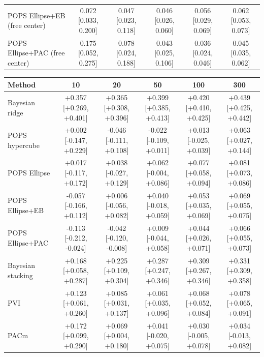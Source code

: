 \begin{tabular}{lccccc}
POPS Ellipse+EB (free center) & 0.072 {\scriptsize[0.033, 0.200]} & 0.047 {\scriptsize[0.023, 0.118]} & 0.046 {\scriptsize[0.026, 0.060]} & 0.056 {\scriptsize[0.029, 0.069]} & 0.062 {\scriptsize[0.053, 0.073]} \\
POPS Ellipse+PAC (free center) & 0.175 {\scriptsize[0.052, 0.275]} & 0.078 {\scriptsize[0.024, 0.188]} & 0.043 {\scriptsize[0.025, 0.106]} & 0.036 {\scriptsize[0.024, 0.046]} & 0.045 {\scriptsize[0.035, 0.062]} \\
\bottomrule
\end{tabular}

\begin{tabular}{lccccc}
\toprule
Method & 10 & 20 & 50 & 100 & 300 \\
\midrule
Bayesian ridge & +0.357 {\scriptsize[+0.269, +0.401]} & +0.365 {\scriptsize[+0.308, +0.396]} & +0.399 {\scriptsize[+0.385, +0.413]} & +0.420 {\scriptsize[+0.410, +0.425]} & +0.439 {\scriptsize[+0.425, +0.442]} \\
POPS hypercube & +0.002 {\scriptsize[-0.147, +0.229]} & -0.046 {\scriptsize[-0.111, +0.108]} & -0.022 {\scriptsize[-0.109, +0.011]} & +0.013 {\scriptsize[-0.025, +0.039]} & +0.063 {\scriptsize[+0.027, +0.144]} \\
POPS Ellipse & +0.017 {\scriptsize[-0.117, +0.172]} & +0.038 {\scriptsize[-0.027, +0.129]} & +0.062 {\scriptsize[-0.004, +0.086]} & +0.077 {\scriptsize[+0.058, +0.094]} & +0.081 {\scriptsize[+0.073, +0.086]} \\
POPS Ellipse+EB & -0.057 {\scriptsize[-0.166, +0.112]} & +0.006 {\scriptsize[-0.056, +0.082]} & +0.040 {\scriptsize[-0.018, +0.059]} & +0.053 {\scriptsize[+0.035, +0.069]} & +0.069 {\scriptsize[+0.055, +0.075]} \\
POPS Ellipse+PAC & -0.113 {\scriptsize[-0.212, -0.024]} & -0.042 {\scriptsize[-0.120, -0.008]} & +0.009 {\scriptsize[-0.044, +0.058]} & +0.044 {\scriptsize[+0.026, +0.071]} & +0.066 {\scriptsize[+0.055, +0.073]} \\
Bayesian stacking & +0.168 {\scriptsize[+0.058, +0.287]} & +0.225 {\scriptsize[+0.109, +0.304]} & +0.287 {\scriptsize[+0.247, +0.346]} & +0.309 {\scriptsize[+0.267, +0.346]} & +0.331 {\scriptsize[+0.309, +0.358]} \\
PVI & +0.123 {\scriptsize[+0.061, +0.260]} & +0.085 {\scriptsize[+0.031, +0.137]} & +0.061 {\scriptsize[+0.035, +0.096]} & +0.068 {\scriptsize[+0.052, +0.084]} & +0.078 {\scriptsize[+0.065, +0.091]} \\
PACm & +0.172 {\scriptsize[+0.099, +0.290]} & +0.069 {\scriptsize[+0.004, +0.180]} & +0.041 {\scriptsize[-0.020, +0.075]} & +0.030 {\scriptsize[-0.005, +0.078]} & +0.034 {\scriptsize[-0.013, +0.082]} \\

\end{tabular}
